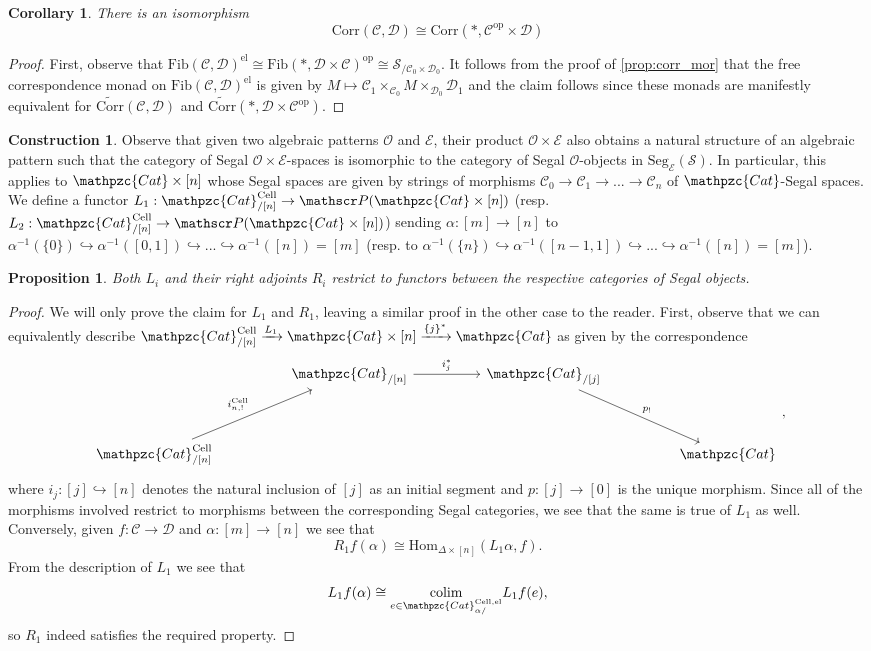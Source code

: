 \documentclass[a4paper, reqno]{amsart}
\newtheorem{prop}[theorem]{Proposition}
\newtheorem{cor}[theorem]{Corollary}
\theoremstyle{definition}
\newtheorem{construction}[theorem]{Construction}
\newcommand\cC{\mathscr C}
\newcommand\cD{\mathscr D}
\newcommand\cE{\mathscr E}
\newcommand\cO{\mathscr O}
\newcommand\cP{\mathscr P}
\newcommand\cS{\mathscr S}
\newcommand\mor{\mathrm{Hom}}
\newcommand\op{\mathrm{op}}
\newcommand\ccat{\mathpzc{Cat}}
\newcommand\colim{\mathrm{colim}}
\newcommand\corr{\mathrm{Corr}}
\newcommand\cell{\mathrm{Cell}}
\newcommand\fib{\mathrm{Fib}}
\newcommand\el{\mathrm{el}}
\newcommand\seg{\mathrm{Seg}}
\begin{document}
\begin{cor}\label{cor:dual}
There is an isomorphism 
\[\corr(\cC,\cD)\cong\corr(*,\cC^\op\times\cD)\]
\end{cor}
\begin{proof}
First, observe that $\fib(\cC,\cD)^\el\cong\fib(*,\cD\times\cC)^\op\cong\cS_{/\cC_0\times\cD_0}$. It follows from the proof of \cref{prop:corr_mor} that the free correspondence monad on $\fib(\cC,\cD)^\el$ is given by $M\mapsto\cC_1\times_{\cC_0}M\times_{\cD_0}\cD_1$ and the claim follows since these monads are manifestly equivalent for $\widetilde{\corr}(\cC,\cD)$ and $\widetilde{\corr}(*,\cD\times\cC^\op)$.
\end{proof}
\begin{construction}\label{constr:tensor}
Observe that given two algebraic patterns $\cO$ and $\cE$, their product $\cO\times\cE$ also obtains a natural structure of an algebraic pattern such that the category of Segal $\cO\times \cE$-spaces is isomorphic to the category of Segal $\cO$-objects in $\seg_{\cE}(\cS)$. In particular, this applies to $\ccat\times[n]$ whose Segal spaces are given by strings of morphisms $\cC_0\rightarrow\cC_1\rightarrow...\rightarrow\cC_n$ of $\ccat$-Segal spaces. We define a functor $L_1:\ccat^\cell_{/[n]}\rightarrow\cP(\ccat\times[n])$ (resp. $L_2:\ccat^\cell_{/[n]}\rightarrow\cP(\ccat\times[n])$) sending $\alpha:[m]\rightarrow[n]$ to $\alpha^{-1}(\{0\})\hookrightarrow\alpha^{-1}([0,1])\hookrightarrow...\hookrightarrow \alpha^{-1}([n])=[m]$ (resp. to $\alpha^{-1}(\{n\})\hookrightarrow\alpha^{-1}([n-1,1])\hookrightarrow...\hookrightarrow \alpha^{-1}([n])=[m]$). 
\end{construction}
\begin{prop}
Both $L_i$ and their right adjoints $R_i$ restrict to functors between the respective categories of Segal objects.
\end{prop}
\begin{proof}
We will only prove the claim for $L_1$ and $R_1$, leaving a similar proof in the other case to the reader. First, observe that we can equivalently describe $\ccat^\cell_{/[n]}\xrightarrow{L_1}\ccat\times[n]\xrightarrow{\{j\}^*}\ccat$ as given by the correspondence
\[
\begin{tikzcd}[row sep=huge, column sep=huge]
{}&\ccat_{/[n]}\arrow[r, "i^*_j"]&\ccat_{/[j]}\arrow[dr, "p_!"]\\
\ccat^\cell_{/[n]}\arrow[ur, "i^\cell_{n,!}"]&{}&{}&\ccat
\end{tikzcd},
\]
where $i_j:[j]\hookrightarrow[n]$ denotes the natural inclusion of $[j]$ as an initial segment and $p:[j]\rightarrow[0]$ is the unique morphism. Since all of the morphisms involved restrict to morphisms between the corresponding Segal categories, we see that the same is true of $L_1$ as well. Conversely, given $f:\cC\rightarrow\cD$ and $\alpha:[m]\rightarrow[n]$ we see that 
\[R_1 f(\alpha)\cong\mor_{\Delta\times [n]}(L_1\alpha,f).\] 
From the description of $L_1$ we see that \[L_1f(\alpha)\cong\underset{e\in\ccat^{\cell,\el}_{\alpha/}}{\colim}L_1f(e),\]
so $R_1$ indeed satisfies the required property.
\end{proof}
\end{document}
